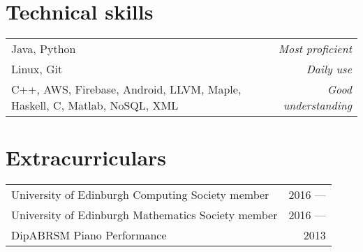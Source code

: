 \documentclass[11pt,a4paper]{article}
\begin{document}
\section*{Technical skills}
\begin{tabularx}{\textwidth}{X r}
    Java, Python & \textit{Most proficient} \\
    Linux, Git & \textit{Daily use} \\
    C++, AWS, Firebase, Android, LLVM, Maple, Haskell, C, Matlab, NoSQL, XML & \textit{Good understanding} \\
\end{tabularx}

\hline
\section*{Extracurriculars}
\begin{tabularx}{\textwidth}{X r}
    University of Edinburgh Computing Society member & 2016 --- \\
    University of Edinburgh Mathematics Society member & 2016 ---\\
    DipABRSM Piano Performance & 2013
\end{tabularx}
\end{document}
